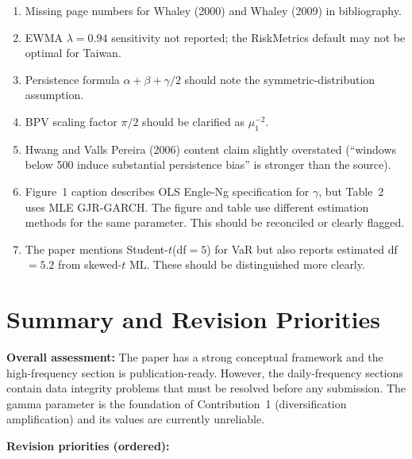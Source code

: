 \documentclass[12pt,a4paper]{article}
\begin{document}
\begin{enumerate}[label=m\arabic*]
\item Missing page numbers for Whaley (2000) and Whaley (2009) in bibliography.
\item EWMA $\lambda = 0.94$ sensitivity not reported; the RiskMetrics default may not be optimal for Taiwan.
\item Persistence formula $\alpha + \beta + \gamma/2$ should note the symmetric-distribution assumption.
\item BPV scaling factor $\pi/2$ should be clarified as $\mu_1^{-2}$.
\item Hwang and Valls Pereira (2006) content claim slightly overstated (``windows below 500 induce substantial persistence bias'' is stronger than the source).
\item Figure~1 caption describes OLS Engle-Ng specification for $\gamma$, but Table~2 uses MLE GJR-GARCH. The figure and table use different estimation methods for the same parameter. This should be reconciled or clearly flagged.
\item The paper mentions Student-$t$(df$=5$) for VaR but also reports estimated df $= 5.2$ from skewed-$t$ ML. These should be distinguished more clearly.
\end{enumerate}


\section*{Summary and Revision Priorities}

\textbf{Overall assessment:} The paper has a strong conceptual framework and the high-frequency section is publication-ready. However, the daily-frequency sections contain data integrity problems that must be resolved before any submission. The gamma parameter is the foundation of Contribution~1 (diversification amplification) and its values are currently unreliable.

\bigskip
\textbf{Revision priorities (ordered):}
\end{document}
